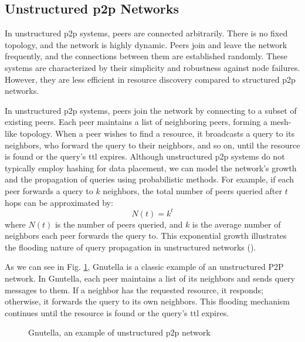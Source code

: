 \subsection{Unstructured \gls{p2p} Networks}
In unstructured \gls{p2p} systems, peers are connected arbitrarily.
There is no fixed topology, and the network is highly dynamic.
Peers join and leave the network frequently, and the connections between them are established randomly.
These systems are characterized by their simplicity and robustness against node failures.
However, they are less efficient in resource discovery compared to structured \gls{p2p} networks.

In unstructured \gls{p2p} systems, peers join the network by connecting to a subset of existing peers.
Each peer maintains a list of neighboring peers, forming a mesh-like topology.
When a peer wishes to find a resource, it broadcasts a query to its neighbors, who forward the query to their neighbors, and so on, until the resource is found or the query's \gls{ttl} expires.
Although unstructured \gls{p2p} systems do not typically employ hashing for data placement, we can model the network's growth and the propagation of queries using probabilistic methods.
For example, if each peer forwards a query to $k$ neighbors, the total number of peers queried after $t$ hops can be approximated by:
\[ N(t) = k^t \]
where $N(t)$ is the number of peers queried, and $k$ is the average number of neighbors each peer forwards the query to.
This exponential growth illustrates the flooding nature of query propagation in unstructured networks (\cite{singh2020}).

As we can see in Fig. \ref{fig:gnutella}, Gnutella is a classic example of an unstructured P2P network.
In Gnutella, each peer maintains a list of its neighbors and sends query messages to them.
If a neighbor has the requested resource, it responds; otherwise, it forwards the query to its own neighbors.
This flooding mechanism continues until the resource is found or the query's \gls{ttl} expires.
\begin{figure}[htbp]
    \centering
    \caption{Gnutella, an example of unstructured \gls{p2p} network}
    \label{fig:gnutella}
\end{figure}

